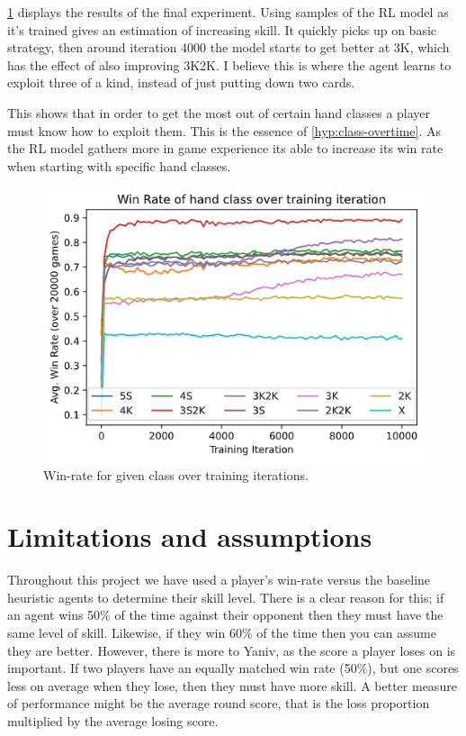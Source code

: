 \documentclass[../main.tex]{subfiles}
\begin{document}
\cref{fig:handclass-overtime} displays the results of the final experiment. Using samples of the RL model as it's trained gives an estimation of increasing skill. It quickly picks up on basic strategy, then around iteration 4000 the model starts to get better at 3K, which has the effect of also improving 3K2K. I believe this is where the agent learns to exploit three of a kind, instead of just putting down two cards.

This shows that in order to get the most out of certain hand classes a player must know how to exploit them. This is the essence of \cref{hyp:class-overtime}. As the RL model gathers more in game experience its able to increase its win rate when starting with specific hand classes.

\begin{figure}
    \centering
    \includegraphics[width=\textwidth,keepaspectratio]{images/results/handclassovertime.png}
    \caption{Win-rate for given class over training iterations.}
    \label{fig:handclass-overtime}
\end{figure}

\section{Limitations and assumptions}
Throughout this project we have used a player's win-rate versus the baseline heuristic agents to determine their skill level. There is a clear reason for this; if an agent wins 50\% of the time against their opponent then they must have the same level of skill. Likewise, if they win 60\% of the time then you can assume they are better. However, there is more to Yaniv, as the score a player loses on is important. If two players have an equally matched win rate (50\%), but one scores less on average when they lose, then they must have more skill. A better measure of performance might be the average round score, that is the loss proportion multiplied by the average losing score. 

\end{document}
